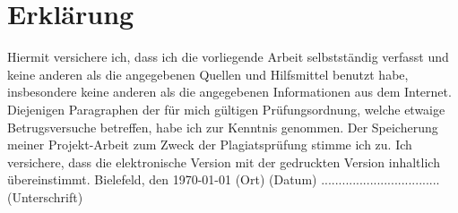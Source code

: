\documentclass[
        ngerman,
        paper=a4,
        numbers=noendperiod,
]{scrreprt}
\begin{document}
        
        




\chapter*{Erklärung}
Hiermit versichere ich, dass ich die vorliegende Arbeit selbstständig verfasst und keine anderen als die angegebenen Quellen und Hilfsmittel benutzt habe, insbesondere keine anderen als die angegebenen Informationen aus dem Internet. Diejenigen Paragraphen der für mich gültigen Prüfungsordnung, welche etwaige Betrugsversuche betreffen, habe ich zur Kenntnis genommen. Der Speicherung meiner Projekt-Arbeit zum Zweck der Plagiatsprüfung stimme ich zu. Ich versichere, dass die elektronische Version mit der gedruckten Version inhaltlich übereinstimmt.\newline
\linebreak
\linebreak
\linebreak
Bielefeld, den \today\newline
(Ort) (Datum)\newline
\linebreak
\linebreak
\linebreak
..................................\newline
(Unterschrift)
\end{document}
